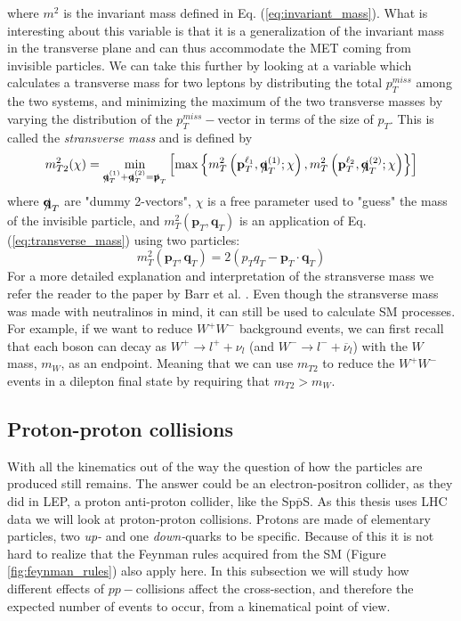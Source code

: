 \documentclass[12pt, a4paper]{book}
\begin{document}
where $m^2$ is the invariant mass defined in Eq. (\ref{eq:invariant_mass}). What is interesting about this variable is that it is a generalization of the invariant mass in the transverse plane and can thus accommodate the MET coming from invisible particles.
We can take this further by looking at a variable which calculates a transverse mass for two leptons by distributing the total $p_T^{miss}$ among the two systems, 
and minimizing the maximum of the two transverse masses by varying the distribution of the $p_T^{miss}-$vector in terms of the size of $p_T$. This is called the \textit{stransverse mass} and is defined by
\begin{equation}\label{eq:stransverse_mass}
    m_{T2}^2(\chi) = \underset{\slashed{\mathbf{q}}^{(1)}_T + \slashed{\mathbf{q}}^{(2)}_T = \slashed{\mathbf{p}}_T}{\min}
    \left[\max \left\{m_T^2\left(\mathbf{p}_T^{\ell_1}, \slashed{\mathbf{q}}^{(1)}_T;\chi\right), m_T^2\left(\mathbf{p}_T^{\ell_2}, \slashed{\mathbf{q}}^{(2)}_T;\chi\right) 
    \right\}\right] 
\end{equation}
where $\slashed{\mathbf{q}}_T$ are "dummy 2-vectors", $\chi$ is a free parameter used to "guess" the mass of the invisible particle, and $m_T^2\left(\mathbf{p}_T, \mathbf{q}_T\right)$ is an application of 
Eq. (\ref{eq:transverse_mass}) using two particles:
$$
m_T^2 \left(\mathbf{p}_T, \mathbf{q}_T\right) = 2(p_T q_T - \mathbf{p}_T\cdot\mathbf{q}_T)
$$
For a more detailed explanation and interpretation of the stransverse mass we refer the reader to the paper by Barr et al. \cite{Barr_2003}. Even though the stransverse mass was made with neutralinos in mind, it can still 
be used to calculate SM processes. For example, if we want to reduce $W^+W^-$ background events, we can first recall that each boson can decay as $W^+\rightarrow l^++\nu_l$ (and $W^-\rightarrow l^-+\overline{\nu}_l$) with the $W$ mass, $m_W$, as an endpoint. 
Meaning that we can use $m_{T2}$ to reduce the $W^+W^-$ events in a dilepton final state by requiring that $m_{T2} > m_W$.

\subsection{Proton-proton collisions}
With all the kinematics out of the way the question of how the particles are produced still remains. The answer could be an electron-positron collider, as they did in LEP, a proton anti-proton collider, like the Sp$\overline{\mbox{p}}$S. As this thesis uses LHC data we will look at proton-proton collisions.
Protons are made of elementary particles, two \textit{up-} and one \textit{down-}quarks to be specific. Because of this it is not hard to realize that the Feynman rules acquired from the SM (Figure \ref{fig:feynman_rules}) also apply here. In this subsection we will study how different effects of $pp-$collisions affect 
the cross-section, and therefore the expected number of events to occur, from a kinematical point of view.
\end{document}
